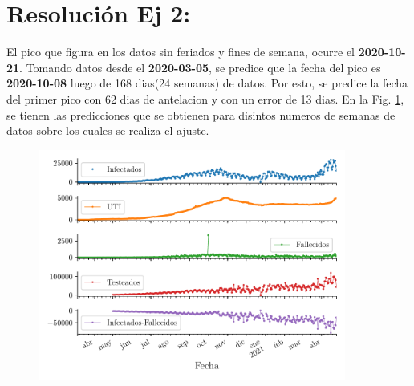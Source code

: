 \documentclass[twocolumn,aps,prl]{revtex4-1}
\begin{document}
\section{Resolución Ej 2:}

El pico que figura en los datos sin feriados y fines de semana, ocurre el \textbf{2020-10-21}. Tomando datos desde el \textbf{2020-03-05}, se predice que la fecha del pico es \textbf{2020-10-08} luego de 168 dias(24 semanas) de datos. Por esto, se predice la fecha del primer pico con 62 dias de antelacion y con un error de 13 dias. En la Fig. \ref{fig:figuras/ex02-resumen}, se tienen las predicciones que se obtienen para disintos numeros de semanas de datos sobre los cuales se realiza el ajuste. 


\begin{figure}[ht!]
  \centering
      \centering
      \includegraphics[width = 0.9\textwidth]{figuras/ex02-resumen.pdf}
      \label{fig:figuras/ex02-resumen}
  \caption{}
\end{figure}
\end{document}
